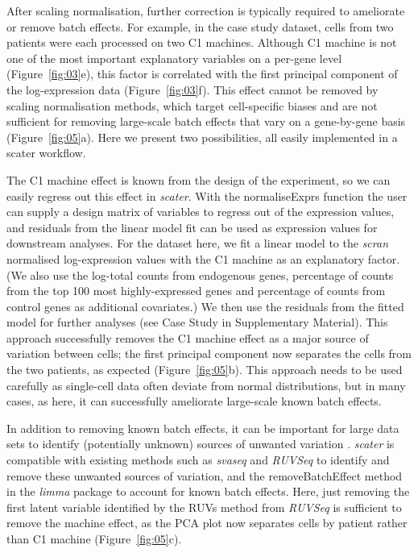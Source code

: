 \documentclass{bioinfo}
\begin{document}
After scaling normalisation, further correction is typically required to ameliorate or remove batch effects. For example, in the case study dataset, cells from two patients were each processed on two C1 machines. Although C1 machine is not one of the most important explanatory variables on a per-gene level (Figure~\ref{fig:03}e), this factor is correlated with the first principal component of the log-expression data (Figure~\ref{fig:03}f). This effect cannot be removed by scaling normalisation methods, which target cell-specific biases and are not sufficient for removing large-scale batch effects that vary on a gene-by-gene basis (Figure~\ref{fig:05}a). Here we present two possibilities, all easily implemented in a scater workflow.

The C1 machine effect is known from the design of the experiment, so we
can easily regress out this effect in \emph{scater}. With the
normaliseExprs function the user can supply a design matrix of variables
to regress out of the expression values, and residuals from the linear
model fit can be used as expression values for downstream analyses. For
the dataset here, we fit a linear model to the \emph{scran} normalised
log-expression values with the C1 machine as an explanatory factor. (We
also use the log-total counts from endogenous genes, percentage of
counts from the top 100 most highly-expressed genes and percentage of
counts from control genes as additional covariates.) We then use the
residuals from the fitted model for further analyses (see Case Study in
Supplementary Material). This approach successfully removes the C1
machine effect as a major source of variation between cells; the first
principal component now separates the cells from the two patients, as
expected (Figure~\ref{fig:05}b). This approach needs to be used carefully
as single-cell data often deviate from normal distributions, but in many
cases, as here, it can successfully ameliorate large-scale known batch
effects.

In addition to removing known batch effects, it can be important for
large data sets to identify (potentially unknown) sources of unwanted variation
\citep{Leek2010-nq,Hicks2015-qy,Tung2016-jy,Bacher2016-ay,Grun2015-xi}.
\emph{scater} is compatible with existing methods such as \emph{svaseq}
\citep{Leek2007-rg,Leek2014-nu} and \emph{RUVSeq} \citep{Risso2014-np} to
identify and remove these unwanted sources of variation, and the
removeBatchEffect method in the \emph{limma} package \citep{Ritchie2015-so}
to account for known batch effects. Here, just removing the first latent
variable identified by the RUVs method from \emph{RUVSeq} is sufficient to
remove the machine effect, as the PCA plot now separates cells by patient
rather than C1 machine (Figure~\ref{fig:05}c).
\end{document}
